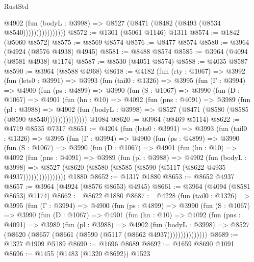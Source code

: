 \begin{lexlean}{RustStd}
\begin{coremodule}
                        @4902
                          (fun (bodyL : @3998) =>
                          @8527 (@8471 (@8482 (@8493 (@8534 @8540))))))))))))))))
@8572 := @1301 (@5061 @1146) @1311
@8574 := @1842 (@5060 @8572)
@8575 := @8569 @8574
@8576 := @8477 @8574
@8580 := @3964 (@4924 (@8576 @4938) @4945)
@8581 := @8488 @8574
@8585 := @3964 (@4094 (@8581 @4938) @1174)
@8587 := @8530 (@4051 @8574)
@8588 := @4035 @8587
@8590 := @3964 (@8588 @4968)
@8618 := @4182
    (fun (rty : @1067) =>
    @3992
      (fun (lets0 : @3991) =>
      @3993
        (fun (tail0 : @1326) =>
        @3995
          (fun (Γ : @3994) =>
          @4900
            (fun (ps : @4899) =>
            @3990
              (fun (S : @1067) =>
              @3990
                (fun (D : @1067) =>
                @4901
                  (fun (hn : @10) =>
                  @4092
                    (fun (pns : @4091) =>
                    @3989
                      (fun (pl : @3988) =>
                      @4902
                        (fun (bodyL : @3998) =>
                        @8527 (@8471 (@8580 (@8585 (@8590 @8540)))))))))))))))
    @1084
@8620 := @3964 (@8469 @5114)
@8622 := @4719 @8535 @7317
@8651 := @4204
    (fun (lets0 : @3991) =>
    @3993
      (fun (tail0 : @1326) =>
      @3995
        (fun (Γ : @3994) =>
        @4900
          (fun (ps : @4899) =>
          @3990
            (fun (S : @1067) =>
            @3990
              (fun (D : @1067) =>
              @4901
                (fun (hn : @10) =>
                @4092
                  (fun (pns : @4091) =>
                  @3989
                    (fun (pl : @3988) =>
                    @4902
                      (fun (bodyL : @3998) =>
                      @8527 (@8620 (@8580 (@8585 (@8590 (@5117 (@8622 @4935 @4937))))))))))))))))
    @1880
@8652 := @1317 @1880
@8653 := @8652 @4937
@8657 := @3964 (@4924 (@8576 @8653) @4945)
@8661 := @3964 (@4094 (@8581 @8653) @1174)
@8662 := @8622 @1880
@8687 := @4228
    (fun (tail0 : @1326) =>
    @3995
      (fun (Γ : @3994) =>
      @4900
        (fun (ps : @4899) =>
        @3990
          (fun (S : @1067) =>
          @3990
            (fun (D : @1067) =>
            @4901
              (fun (hn : @10) =>
              @4092
                (fun (pns : @4091) =>
                @3989
                  (fun (pl : @3988) =>
                  @4902
                    (fun (bodyL : @3998) =>
                    @8527 (@8620 (@8657 (@8661 (@8590 (@5117 (@8662 @4937)))))))))))))))
@8689 := @1327 @1909 @5189
@8690 := @1696 @8689
@8692 := @1659 @8690 @1091
@8696 := @1455 (@1483 (@1320 @8692)) @1523

\end{coremodule}
\end{lexlean}
